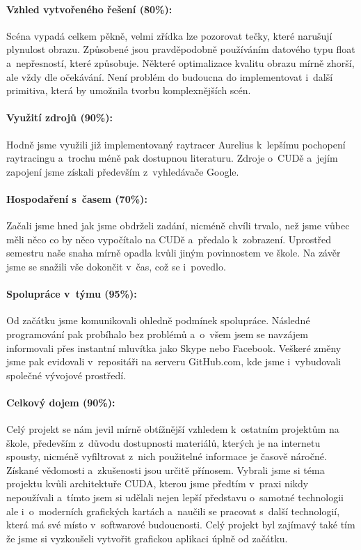 \documentclass[12pt,a4paper,titlepage,final]{report}
\begin{document}
\paragraph{Vzhled vytvořeného řešení (80\%):} 
Scéna vypadá celkem pěkně, velmi zřídka lze pozorovat tečky, které narušují plynulost obrazu. Způsobené jsou pravděpodobně používáním datového typu float a~nepřesností, které způsobuje. Některé optimalizace kvalitu obrazu mírně zhorší, ale vždy dle očekávání. Není problém do budoucna do implementovat i~další primitiva, která by umožnila tvorbu komplexnějších scén.

\paragraph{Využití zdrojů (90\%):}
Hodně jsme využili již implementovaný raytracer Aurelius k~lepšímu pochopení raytracingu a~trochu méně pak dostupnou literaturu. Zdroje o~CUDě a~jejím zapojení jsme získali především z~vyhledávače Google.

\paragraph{Hospodaření s~časem (70\%):}
Začali jsme hned jak jsme obdrželi zadání, nicméně chvíli trvalo, než jsme vůbec měli něco co by něco vypočítalo na CUDě a~předalo k~zobrazení. Uprostřed semestru naše snaha mírně opadla kvůli jiným povinnostem ve škole. Na závěr jsme se snažili vše dokončit v~čas, což se i~povedlo.

\paragraph{Spolupráce v~týmu (95\%):}
Od začátku jsme komunikovali ohledně podmínek spolupráce. Následné programování pak probíhalo bez problémů a~o~všem jsem se navzájem informovali přes instantní mluvítka jako Skype nebo Facebook. Veškeré změny jsme pak evidovali v~repositáři na serveru GitHub.com, kde jsme i~vybudovali společné vývojové prostředí.

\paragraph{Celkový dojem (90\%):} 
Celý projekt se nám jevil mírně obtížnější vzhledem k~ostatním projektům na škole, především z~důvodu dostupnosti materiálů, kterých je na internetu spousty, nicméně vyfiltrovat z~nich použitelné informace je časově náročné. 
Získané vědomosti a~zkušenosti jsou určitě přínosem. 
Vybrali jsme si téma projektu kvůli architektuře CUDA, kterou jsme předtím v~praxi nikdy nepoužívali a~tímto jsem si udělali nejen lepší představu o~samotné technologii ale i~o~moderních grafických kartách a~naučili se pracovat s~další technologií, která má své místo v~softwarové budoucnosti. Celý projekt byl zajímavý také tím že jsme si vyzkoušeli vytvořit grafickou aplikaci úplně od začátku.
\end{document}
